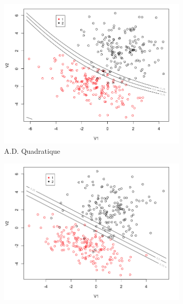 \documentclass[a4paper,10pt]{report}
\begin{document}
\begin{figure}[H]
	\centering
	\captionsetup{justification=centering, margin=2cm}
	\begin{subfigure}[b]{0.45\linewidth}
		\centering
		\captionsetup{justification=centering, margin=1cm}
		\includegraphics[width=1\linewidth]{img/front-decision-synth-1-adq}
		\caption{\small A.D. Quadratique}
		\label{fig:front-decision-synth-1-adq}%
	\end{subfigure}%
	\begin{subfigure}[b]{0.45\linewidth}
		\centering
		\captionsetup{justification=centering, margin=1cm}
		\includegraphics[width=1\linewidth]{img/front-decision-synth-1-adl}

\end{subfigure}
\end{figure}
\end{document}
